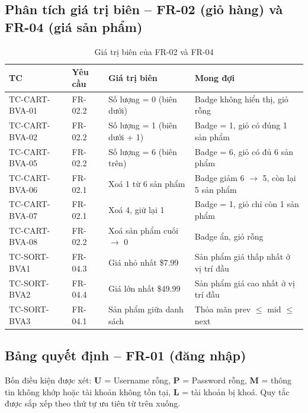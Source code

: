 \documentclass[12pt,a4paper]{article}
\newcommand{\tablestyle}{\small\renewcommand{\arraystretch}{1.25}}
\newcommand{\hrow}{\rowcolor{tablehead}}
\begin{document}
\subsection{Phân tích giá trị biên -- FR-02 (giỏ hàng) và FR-04 (giá sản phẩm)}
\begin{table}[H]
\centering
\tablestyle
\caption{Giá trị biên của FR-02 và FR-04}
\label{tab:bva}
\begin{tabularx}{\textwidth}{L{3.3cm}L{1.9cm}L{3.6cm}Y}
\toprule
\hrow \textbf{TC} & \textbf{Yêu cầu} & \textbf{Giá trị biên} & \textbf{Mong đợi} \\
\midrule
TC-CART-BVA-01 & FR-02.2 & Số lượng = 0 (biên dưới) & Badge không hiển thị, giỏ rỗng \\
TC-CART-BVA-02 & FR-02.2 & Số lượng = 1 (biên dưới + 1) & Badge = 1, giỏ có đúng 1 sản phẩm \\
TC-CART-BVA-05 & FR-02.2 & Số lượng = 6 (biên trên) & Badge = 6, giỏ có đủ 6 sản phẩm \\
TC-CART-BVA-06 & FR-02.1 & Xoá 1 từ 6 sản phẩm & Badge giảm 6 $\rightarrow$ 5, còn lại 5 sản phẩm \\
TC-CART-BVA-07 & FR-02.1 & Xoá 4, giữ lại 1 & Badge = 1, giỏ chỉ còn 1 sản phẩm \\
TC-CART-BVA-08 & FR-02.2 & Xoá sản phẩm cuối $\rightarrow$ 0 & Badge ẩn, giỏ rỗng \\
TC-SORT-BVA1 & FR-04.3 & Giá nhỏ nhất \$7.99 & Sản phẩm giá thấp nhất ở vị trí đầu \\
TC-SORT-BVA2 & FR-04.4 & Giá lớn nhất \$49.99 & Sản phẩm giá cao nhất ở vị trí đầu \\
TC-SORT-BVA3 & FR-04.1 & Sản phẩm giữa danh sách & Thỏa mãn prev $\leq$ mid $\leq$ next \\
\bottomrule
\end{tabularx}
\end{table}

\subsection{Bảng quyết định -- FR-01 (đăng nhập)}
Bốn điều kiện được xét: \textbf{U} = Username rỗng, \textbf{P} = Password rỗng,
\textbf{M} = thông tin không khớp hoặc tài khoản không tồn tại, \textbf{L} = tài khoản bị khoá.
Quy tắc được sắp xếp theo thứ tự ưu tiên từ trên xuống.
\end{document}
